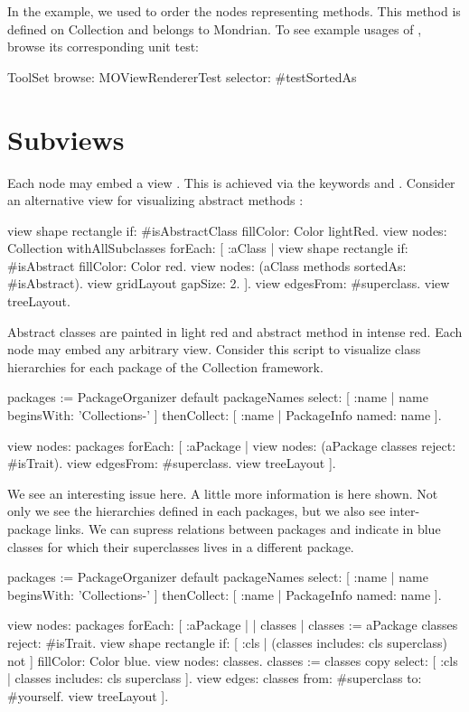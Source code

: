 \documentclass[a4paper,10pt,twoside]{book}
\begin{document}
In the example, we used  to order the nodes representing methods. This method is defined on Collection and belongs to Mondrian. To see example usages of , browse its corresponding unit test:
\begin{code}{}
ToolSet browse: MOViewRendererTest selector: #testSortedAs 
\end{code}

\section{Subviews}

Each node may embed a view . This is achieved via the keywords  and . Consider an alternative view for visualizing abstract methods :

\begin{code}{}
view shape rectangle
  if: #isAbstractClass fillColor: Color lightRed.
view nodes: Collection withAllSubclasses forEach: [ :aClass | 
  view shape rectangle 
    if: #isAbstract fillColor: Color red.
  view nodes: (aClass methods sortedAs: #isAbstract).
  view gridLayout gapSize: 2. 
].
view edgesFrom: #superclass.
view treeLayout.
\end{code}

Abstract classes are painted in light red and abstract method in intense red. 
Each node may embed any arbitrary view. Consider this script to visualize class hierarchies for each package of the Collection framework.

\begin{code}{}
packages := PackageOrganizer default packageNames
        select: [ :name | name beginsWith: 'Collections-' ] 
        thenCollect:  [ :name | PackageInfo named: name ].
        
view nodes: packages forEach: [ :aPackage | 
  view nodes: (aPackage classes reject: #isTrait).
  view edgesFrom: #superclass.
  view treeLayout
].
\end{code}

We see an interesting issue here. A little more information is here shown. Not only we see the hierarchies defined in each packages, but we also see inter-package links. We can supress relations between packages and indicate in blue classes  for which their superclasses lives in a different package.

\begin{code}{}
packages := PackageOrganizer default packageNames
        select: [ :name | name beginsWith: 'Collections-' ] 
        thenCollect:  [ :name | PackageInfo named: name ].
        
view nodes: packages forEach: [ :aPackage | 
  | classes |
  classes := aPackage classes reject: #isTrait.
  view shape rectangle 
    if: [ :cls | (classes includes: cls superclass) not ] fillColor: Color blue.
  view nodes: classes.
  classes := classes copy select: [ :cls | classes includes: cls superclass ].
  view edges: classes from: #superclass to: #yourself.
  view treeLayout
].
\end{code}
\end{document}
